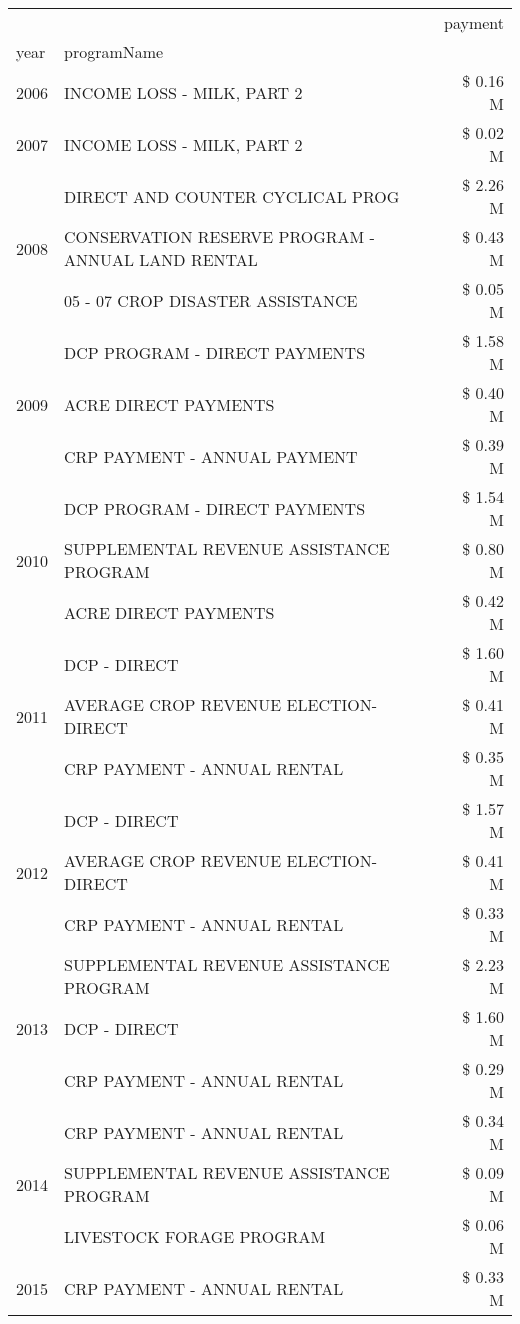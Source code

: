 \begin{tabular}{llr}
\toprule
 &  & payment \\
year & programName &  \\
\midrule
2006 & INCOME LOSS - MILK, PART 2 & \$ 0.16 M \\
\cline{1-3}
2007 & INCOME LOSS - MILK, PART 2 & \$ 0.02 M \\
\cline{1-3}
\multirow[t]{3}{*}{2008} & DIRECT AND COUNTER CYCLICAL PROG & \$ 2.26 M \\
 & CONSERVATION RESERVE PROGRAM - ANNUAL LAND RENTAL & \$ 0.43 M \\
 & 05 - 07 CROP DISASTER ASSISTANCE & \$ 0.05 M \\
\cline{1-3}
\multirow[t]{3}{*}{2009} & DCP PROGRAM - DIRECT PAYMENTS & \$ 1.58 M \\
 & ACRE DIRECT PAYMENTS & \$ 0.40 M \\
 & CRP PAYMENT - ANNUAL PAYMENT & \$ 0.39 M \\
\cline{1-3}
\multirow[t]{3}{*}{2010} & DCP PROGRAM - DIRECT PAYMENTS & \$ 1.54 M \\
 & SUPPLEMENTAL REVENUE ASSISTANCE PROGRAM & \$ 0.80 M \\
 & ACRE DIRECT PAYMENTS & \$ 0.42 M \\
\cline{1-3}
\multirow[t]{3}{*}{2011} & DCP - DIRECT & \$ 1.60 M \\
 & AVERAGE CROP REVENUE ELECTION-DIRECT & \$ 0.41 M \\
 & CRP PAYMENT - ANNUAL RENTAL & \$ 0.35 M \\
\cline{1-3}
\multirow[t]{3}{*}{2012} & DCP - DIRECT & \$ 1.57 M \\
 & AVERAGE CROP REVENUE ELECTION-DIRECT & \$ 0.41 M \\
 & CRP PAYMENT - ANNUAL RENTAL & \$ 0.33 M \\
\cline{1-3}
\multirow[t]{3}{*}{2013} & SUPPLEMENTAL REVENUE ASSISTANCE PROGRAM & \$ 2.23 M \\
 & DCP - DIRECT & \$ 1.60 M \\
 & CRP PAYMENT - ANNUAL RENTAL & \$ 0.29 M \\
\cline{1-3}
\multirow[t]{3}{*}{2014} & CRP PAYMENT - ANNUAL RENTAL & \$ 0.34 M \\
 & SUPPLEMENTAL REVENUE ASSISTANCE PROGRAM & \$ 0.09 M \\
 & LIVESTOCK FORAGE PROGRAM & \$ 0.06 M \\
\cline{1-3}
\multirow[t]{3}{*}{2015} & CRP PAYMENT - ANNUAL RENTAL & \$ 0.33 M \\

\end{tabular}
